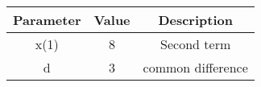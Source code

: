 

    \begin{tabular}{|c|c|c|}
        \hline
        \textbf{Parameter} & \textbf{Value} & \textbf{Description} \\
        \hline
        x(1)  & 8 & Second term \\
        d     & 3 & common difference\\
        \hline
    \end{tabular}
    
    


